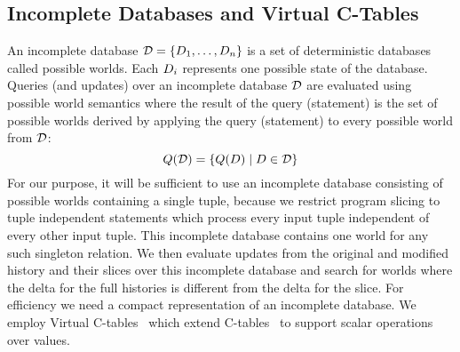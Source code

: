 \subsection{Incomplete Databases and Virtual C-Tables}
\label{sec:vc-tb}
An incomplete database $\mathcal{D} = \{ D_1, \ldots, D_n \}$ is a set of deterministic databases called possible worlds. Each $D_i$ represents one possible state of the database. Queries (and updates) over an incomplete database $\mathcal{D}$ are evaluated using possible world semantics where the result of the query (statement) is the set of possible worlds derived by applying the query (statement) to every possible world from $\mathcal{D}$: %
%
$$Q(\mathcal{D}) = \{ Q(D) \mid D \in \mathcal{D} \}$$
%
For our purpose, it will be sufficient to use an incomplete database consisting of possible worlds containing a single tuple, because we restrict program slicing to tuple independent statements which process every input tuple independent of every other input tuple.
%
This incomplete database contains one world for any such singleton relation.
We then evaluate updates from the original and modified history and their slices over this incomplete database and search for worlds where the delta for the full histories is different from the delta for the slice.
For efficiency we need a compact representation of an incomplete database. We employ Virtual C-tables~\cite{pip10,lenses15} which extend C-tables~\cite{IL84a} to support scalar operations over values.

